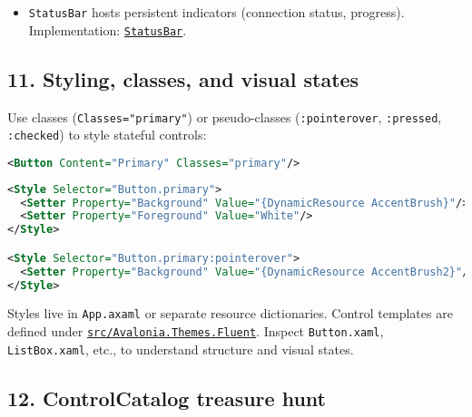 \begin{itemize}
\tightlist
\item
  \passthrough{\lstinline!StatusBar!} hosts persistent indicators
  (connection status, progress). Implementation:
  \href{https://github.com/AvaloniaUI/Avalonia/blob/master/src/Avalonia.Controls/StatusBar/StatusBar.cs}{\passthrough{\lstinline!StatusBar!}}.
\end{itemize}

\subsection{11. Styling, classes, and visual
states}\label{styling-classes-and-visual-states}

Use classes (\passthrough{\lstinline!Classes="primary"!}) or
pseudo-classes (\passthrough{\lstinline!:pointerover!},
\passthrough{\lstinline!:pressed!}, \passthrough{\lstinline!:checked!})
to style stateful controls:

\begin{lstlisting}[language=XML]
<Button Content="Primary" Classes="primary"/>
\end{lstlisting}

\begin{lstlisting}[language=XML]
<Style Selector="Button.primary">
  <Setter Property="Background" Value="{DynamicResource AccentBrush}"/>
  <Setter Property="Foreground" Value="White"/>
</Style>

<Style Selector="Button.primary:pointerover">
  <Setter Property="Background" Value="{DynamicResource AccentBrush2}"/>
</Style>
\end{lstlisting}

Styles live in \passthrough{\lstinline!App.axaml!} or separate resource
dictionaries. Control templates are defined under
\href{https://github.com/AvaloniaUI/Avalonia/tree/master/src/Avalonia.Themes.Fluent/Controls}{\passthrough{\lstinline!src/Avalonia.Themes.Fluent!}}.
Inspect \passthrough{\lstinline!Button.xaml!},
\passthrough{\lstinline!ListBox.xaml!}, etc., to understand structure
and visual states.

\subsection{12. ControlCatalog treasure
hunt}\label{controlcatalog-treasure-hunt}

